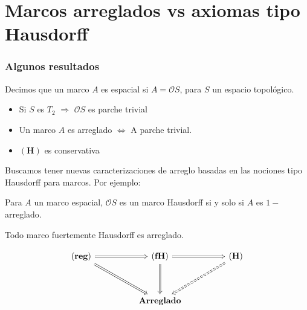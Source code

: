 \documentclass[compress,12pt]{beamer}
\begin{document}
\section{Marcos arreglados vs axiomas tipo Hausdorff}

\begin{frame}
\frametitle{Algunos resultados}
\begin{definition}
    Decimos que un marco $A$ es espacial si $A=\mathcal{O}S$, para $S$ un espacio topológico.
\end{definition}

\end{frame}

\begin{frame}[plain]
    \begin{itemize}
        \item Si $S$ es $T_2$ $\Rightarrow$ $\mathcal{O}S$ es parche trivial
        \item<2-> Un marco $A$ es arreglado $\Leftrightarrow$ A parche trivial.
        \item<3-> $\mathbf{(H)}$ es conservativa
    \end{itemize}


\end{frame}

\begin{frame}
    Buscamos tener nuevas caracterizaciones de arreglo basadas en las nociones tipo Hausdorff para marcos. Por ejemplo:

\begin{theorem}
        Para $A$ un marco espacial, $\mathcal{O}S$ es un marco Hausdorff si y solo si $A$ es $1-$arreglado.
    \end{theorem}

\begin{theorem}
    Todo marco fuertemente Hausdorff es arreglado.
\end{theorem}

\[\begin{tikzcd}
	{\mathbf{(reg)}} && {\mathbf{(fH)}} && {\mathbf{(H)}} \\
	\\
	&& {\mathbf{Arreglado}}
	\arrow[Rightarrow, from=1-1, to=1-3]
	\arrow[Rightarrow, from=1-1, to=3-3]
	\arrow[Rightarrow, from=1-3, to=1-5]
	\arrow[Rightarrow, from=1-3, to=3-3]
	\arrow[Rightarrow, dashed, from=1-5, to=3-3]
\end{tikzcd}\]
\end{frame}
\end{document}
